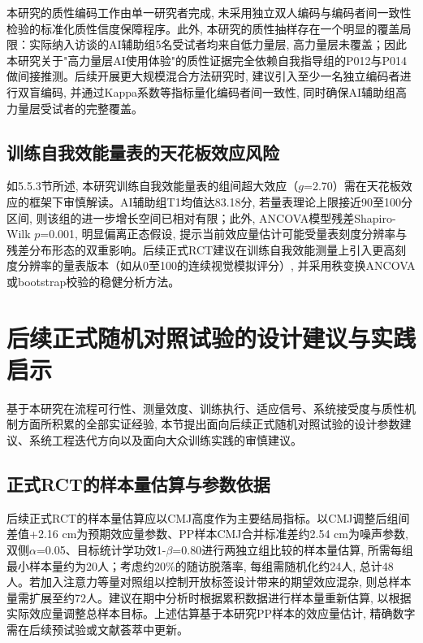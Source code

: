 本研究的质性编码工作由单一研究者完成, 未采用独立双人编码与编码者间一致性检验的标准化质性信度保障程序。此外, 本研究的质性抽样存在一个明显的覆盖局限：实际纳入访谈的AI辅助组5名受试者均来自低力量层, 高力量层未覆盖；因此本研究关于"高力量层AI使用体验"的质性证据完全依赖自我指导组的P012与P014做间接推测。后续开展更大规模混合方法研究时, 建议引入至少一名独立编码者进行双盲编码, 并通过Kappa系数等指标量化编码者间一致性, 同时确保AI辅助组高力量层受试者的完整覆盖。

\subsection{训练自我效能量表的天花板效应风险}
\label{sec:se_ceiling}

如5.5.3节所述, 本研究训练自我效能量表的组间超大效应（$g$=2.70）需在天花板效应的框架下审慎解读。AI辅助组T1均值达83.18分, 若量表理论上限接近90至100分区间, 则该组的进一步增长空间已相对有限；此外, ANCOVA模型残差Shapiro-Wilk $p$=0.001, 明显偏离正态假设, 提示当前效应量估计可能受量表刻度分辨率与残差分布形态的双重影响。后续正式RCT建议在训练自我效能测量上引入更高刻度分辨率的量表版本（如从0至100的连续视觉模拟评分）, 并采用秩变换ANCOVA或bootstrap校验的稳健分析方法。

\section{后续正式随机对照试验的设计建议与实践启示}
\label{sec:rct_recommendations}

基于本研究在流程可行性、测量效度、训练执行、适应信号、系统接受度与质性机制方面所积累的全部实证经验, 本节提出面向后续正式随机对照试验的设计参数建议、系统工程迭代方向以及面向大众训练实践的审慎建议。

\subsection{正式RCT的样本量估算与参数依据}
\label{sec:sample_size}

后续正式RCT的样本量估算应以CMJ高度作为主要结局指标。以CMJ调整后组间差值+2.16 cm为预期效应量参数、PP样本CMJ合并标准差约2.54 cm为噪声参数, 双侧$\alpha$=0.05、目标统计学功效1-$\beta$=0.80进行两独立组比较的样本量估算, 所需每组最小样本量约为20人；考虑约20\%的随访脱落率, 每组需随机化约24人, 总计48人。若加入注意力等量对照组以控制开放标签设计带来的期望效应混杂, 则总样本量需扩展至约72人。建议在期中分析时根据累积数据进行样本量重新估算, 以根据实际效应量调整总样本目标。上述估算基于本研究PP样本的效应量估计, 精确数字需在后续预试验或文献荟萃中更新。

